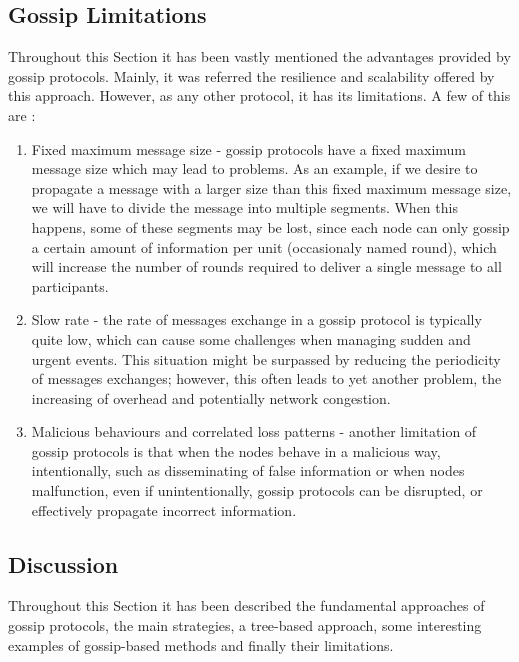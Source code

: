 \subsection{Gossip Limitations}
\label{subsec:gossip_limitations}
Throughout this Section it has been vastly mentioned the advantages provided by gossip
protocols. Mainly, it was referred the resilience and scalability offered by this approach.
However, as any other protocol, it has its limitations. A few of this are \cite{Birman2007}:
\begin{enumerate}
      \item Fixed maximum message size - gossip protocols have a fixed maximum message size
            which may lead to problems. %
            As an example, if we desire to propagate a message with a larger size than this
            fixed maximum message size, we will have to divide the message into multiple
            segments. When this happens, some of these segments may be lost, since each node
            can only gossip a certain amount of information per %
            unit (occasionaly named round), which will increase the number of rounds required
            to deliver a single message to all participants.
      \item Slow rate - the rate of messages exchange in a gossip protocol is typically quite
            low, which can cause some challenges when managing sudden and urgent events. This
            situation might be surpassed by reducing the periodicity of messages exchanges;
            however, this often leads to yet another problem, the increasing of overhead and
            potentially network congestion.
      \item Malicious behaviours and correlated loss patterns - another limitation of gossip
            protocols is that when the nodes behave in a malicious way, intentionally, such as
            disseminating of false information or when nodes malfunction, even if unintentionally,
            gossip protocols can be disrupted, or effectively propagate incorrect information.
\end{enumerate}


\subsection{Discussion}
\label{subsec:gossip_discussion}
Throughout this Section it has been described the fundamental approaches of gossip protocols,
the main strategies, a tree-based approach, some interesting examples of gossip-based methods
and finally their limitations.

